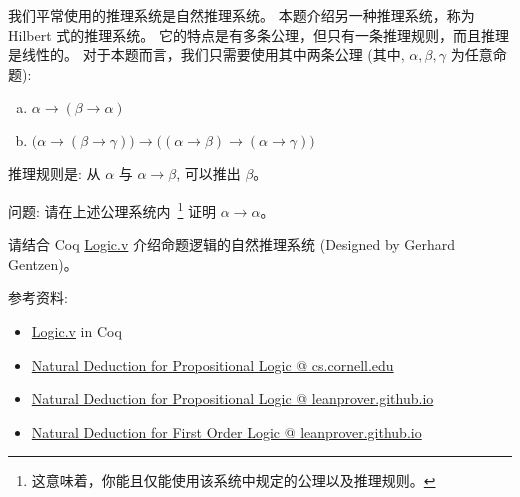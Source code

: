 \documentclass[a4paper, justified]{tufte-handout}
\begin{document}
\beginoptional
\begin{problem}
  我们平常使用的推理系统是自然推理系统。
  本题介绍另一种推理系统，称为 Hilbert 式的推理系统。
  它的特点是有多条公理，但只有一条推理规则，而且推理是线性的。
  对于本题而言，我们只需要使用其中两条公理 
  (其中, $\alpha, \beta, \gamma$ 为任意命题):
  \begin{enumerate}[(a)]
    \item $\alpha \to (\beta \to \alpha)$
    \item $\big(\alpha \to (\beta \to \gamma)\big) \to 
      \big((\alpha \to \beta) \to (\alpha \to \gamma) \big)$
    \end{enumerate}
  推理规则是: 从 $\alpha$ 与 $\alpha \to \beta$, 可以推出 $\beta$。

  \vspace{8pt}
  \noindent 问题: 请在上述公理系统内~\footnote{这意味着，你能且仅能使用该系统中规定的公理以及推理规则。}
  证明 $\alpha \to \alpha$。
\end{problem}

\begin{solution}
\end{solution}

\beginot
\begin{ot}[自然推理系统]
  请结合 Coq 
  \href{https://github.com/hengxin/problem-solving-class-coq/blob/master/2019-1-coq/Logic.v}{Logic.v}
  介绍命题逻辑的自然推理系统 (Designed by Gerhard Gentzen)。

  \noindent 参考资料:
  \begin{itemize}
    \item \href{https://github.com/hengxin/problem-solving-class-coq/blob/master/2019-1-coq/Logic.v}{Logic.v} in Coq
    \item \href{https://www.cs.cornell.edu/courses/cs3110/2013sp/lectures/lec15-logic-contd/lec15.html}{Natural Deduction for Propositional Logic @ cs.cornell.edu}
    \item \href{http://leanprover.github.io/logic\_and\_proof/natural\_deduction\_for\_propositional\_logic.html}
      {Natural Deduction for Propositional Logic @ leanprover.github.io}
    \item \href{http://leanprover.github.io/logic\_and\_proof/natural\_deduction\_for\_first\_order\_logic.html}
      {Natural Deduction for First Order Logic @ leanprover.github.io}
  \end{itemize}
\end{ot}
\end{document}

